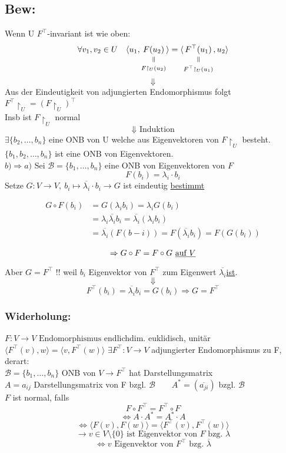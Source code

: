 \documentclass[titlepage,12pt,a4paper,ngerman]{report}
\newcommand{\verteq}{\rotatebox{90}{$\,=$}}
\newcommand{\equalto}[2]{\underset{\scriptstyle\overset{\mkern4mu\verteq}{#2}}{#1}}
\newcommand{\tx}[1]{\textrm{#1}}
\newcommand{\basis}[3]{\{#1_{#2}, \dots, #1_{#3}\}}
\newcommand{\ska}[2]{\langle #1 , #2 \rangle}
\newcommand{\enph}{F: V \to V \textrm{ Endomorphismus}}
\begin{document}
\subsection{Bew:}
Wenn U $ F^\top $-invariant ist wie oben:\\
$$ \forall v_1,v_2 \in U \quad \langle u_1,\equalto{F(u_2)}{F\upharpoonright_U(u_2)} \rangle = \langle \equalto{F^\top(u_1)}{F^\top\upharpoonright_U(u_1)} , u_2 \rangle $$
$$\Downarrow$$
Aus der Eindeutigkeit von adjungierten Endomorphismus  folgt\\
$ F^\top \upharpoonright_U = (F\upharpoonright_U)^\top $\\
Insb ist $ F\upharpoonright_U $ normal 
$$\Downarrow \tx{ Induktion}$$
$ \exists \basis{b}{2}{n} $ eine ONB von U welche aus Eigenvektoren von $ F\upharpoonright _U $ besteht.\\
$ \{ b_1, b_2 , \dots , b_n \} $ ist eine ONB von Eigenvektoren.\\
$\boxed{b) \Rightarrow a)}$ Sei $\mathcal B = \basis{b}{1}{n}$ eine ONB von Eigenvektoren von $F$
$$F(b_i) = \lambda_i \cdot b_i$$
Setze $G: V \to V,\ b_i \mapsto \overline{\lambda_i}\cdot b_i\rightarrow G$ ist eindeutig \underline{bestimmt}

\begin{align*}
G \circ F ( b_i) &= G(\lambda_i b_i) = \lambda_i G (b_i)\\
&= \lambda_i \overline{\lambda_i} b_i = \overline{\lambda_i} (\lambda_i b_i)\\
&= \overline{\lambda_i}(F(b-i)) = F(\overline{\lambda_i}b_i) = F(G(b_i))
\end{align*}

$$\Rightarrow G \circ F = F \circ G \tx{ \underline{auf $V$}}$$

Aber $ G = F^\top $ !! weil $ b_i $ Eigenvektor von $ F^\top $ zum Eigenwert $ \overline{\lambda_i} $\underline{ist}.
$$ \Downarrow $$
$$F^\top(b_i) = \overline{\lambda_i} b_i = G(b_i) \Rightarrow G = F^\top$$ 


\subsubsection{Widerholung:}
$ \enph $ endlichdim. euklidisch, unitär\\ $\ska{F^\top(v)}{w} = \ska{v}{F^\top(w)} $
$ \exists F^\top: V \to V $ adjungierter Endomorphismus zu F, derart:\\
$ \mathcal{B} = \basis{b}{1}{n} $ ONB von $ V \to F^\top $ hat Darstellungsmatrix \\
$ A = a_{ij} $ Darstellungsmatrix von F bzgl. $ \mathcal{B} \qquad A^* = (\overline{a_{ji}})$ bzgl. $\mathcal{B}$\\
$F$ ist normal, falls $$F \circ F^\top = F^\top \circ F$$
$$\Leftrightarrow A \cdot A^* = A^* \cdot A$$
$$\Leftrightarrow \ska{F(v)}{F(w)} = \ska{F^\top (v)}{F^\top (w)}$$
$$\longrightarrow v \in V \setminus \{0\} \tx{ ist Eigenvektor von $F$ bzg. } \lambda $$
$$\Leftrightarrow v \tx{ Eigenvektor von } F^\top \tx{ bzg. } \overline{\lambda}$$
\end{document}
